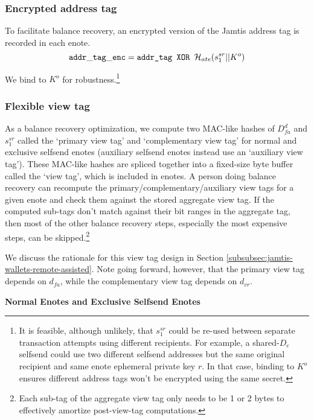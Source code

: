 \subsubsection{Encrypted address tag}
\label{subsubsec:jamtis-enote-construction-encrypted-addr-tag}

To facilitate balance recovery, an encrypted version of the Jamtis address tag is recorded in each enote.
\[ {\tt addr\_tag\_enc} = \textrm{\tt addr\_tag XOR } \mathcal{H}_{ate}(s^{sr}_1 || K^o) \]

We bind to $K^o$ for robustness.\footnote{It is feasible, although unlikely, that $s^{sr}_1$ could be re-used between separate transaction attempts using different recipients. For example, a shared-$D_e$ selfsend could use two different selfsend addresses but the same original recipient and same enote ephemeral private key $r$. In that case, binding to $K^o$ ensures different address tags won't be encrypted using the same secret.}

\subsubsection{Flexible view tag}
\label{subsubsec:jamtis-enote-construction-view-tag}

As a balance recovery optimization, we compute two MAC-like hashes of $D^d_{fa}$ and $s^{sr}_1$ called the `primary view tag' and `complementary view tag' \cite{reduce-scan-times-view-tag-research-issue-73} for normal and exclusive selfsend enotes (auxiliary selfsend enotes instead use an `auxiliary view tag'). These MAC-like hashes are spliced together into a fixed-size byte buffer called the `view tag', which is included in enotes. A person doing balance recovery can recompute the primary/complementary/auxiliary view tags for a given enote and check them against the stored aggregate view tag. If the computed sub-tags don't match against their bit ranges in the aggregate tag, then most of the other balance recovery steps, especially the most expensive steps, can be skipped.\footnote{Each sub-tag of the aggregate view tag only needs to be 1 or 2 bytes to effectively amortize post-view-tag computations.}

We discuss the rationale for this view tag design in Section \ref{subsubsec:jamtis-wallets-remote-assisted}. Note going forward, however, that the primary view tag depends on $d_{fa}$, while the complementary view tag depends on $d_{vr}$.

\textbf{Normal Enotes and Exclusive Selfsend Enotes}

